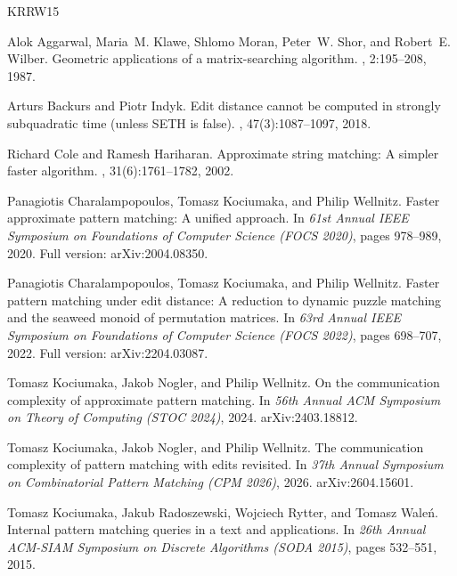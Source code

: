 \documentclass[10pt]{article}
\begin{document}
\newcommand{\etalchar}[1]{$^{#1}$}
\begin{thebibliography}{KRRW15}

\bibitem[AKM{\etalchar{+}}87]{AKMSW87}
Alok Aggarwal, Maria~M. Klawe, Shlomo Moran, Peter~W. Shor, and Robert~E.
  Wilber.
\newblock Geometric applications of a matrix-searching algorithm.
, 2:195--208, 1987.

Arturs Backurs and Piotr Indyk.
\newblock Edit distance cannot be computed in strongly subquadratic time
  (unless {SETH} is false).
, 47(3):1087--1097, 2018.

Richard Cole and Ramesh Hariharan.
\newblock Approximate string matching: A simpler faster algorithm.
, 31(6):1761--1782, 2002.

Panagiotis Charalampopoulos, Tomasz Kociumaka, and Philip Wellnitz.
\newblock Faster approximate pattern matching: A unified approach.
\newblock In {\em 61st Annual IEEE Symposium on Foundations of Computer Science
  (FOCS 2020)}, pages 978--989, 2020.
\newblock Full version: arXiv:2004.08350.

Panagiotis Charalampopoulos, Tomasz Kociumaka, and Philip Wellnitz.
\newblock Faster pattern matching under edit distance: A reduction to dynamic
  puzzle matching and the seaweed monoid of permutation matrices.
\newblock In {\em 63rd Annual IEEE Symposium on Foundations of Computer Science
  (FOCS 2022)}, pages 698--707, 2022.
\newblock Full version: arXiv:2204.03087.

Tomasz Kociumaka, Jakob Nogler, and Philip Wellnitz.
\newblock On the communication complexity of approximate pattern matching.
\newblock In {\em 56th Annual ACM Symposium on Theory of Computing (STOC
  2024)}, 2024.
\newblock arXiv:2403.18812.

Tomasz Kociumaka, Jakob Nogler, and Philip Wellnitz.
\newblock The communication complexity of pattern matching with edits
  revisited.
\newblock In {\em 37th Annual Symposium on Combinatorial Pattern Matching (CPM
  2026)}, 2026.
\newblock arXiv:2604.15601.

Tomasz Kociumaka, Jakub Radoszewski, Wojciech Rytter, and Tomasz Wale{\'n}.
\newblock Internal pattern matching queries in a text and applications.
\newblock In {\em 26th Annual ACM-SIAM Symposium on Discrete Algorithms (SODA
  2015)}, pages 532--551, 2015.


\end{thebibliography}
\end{document}
